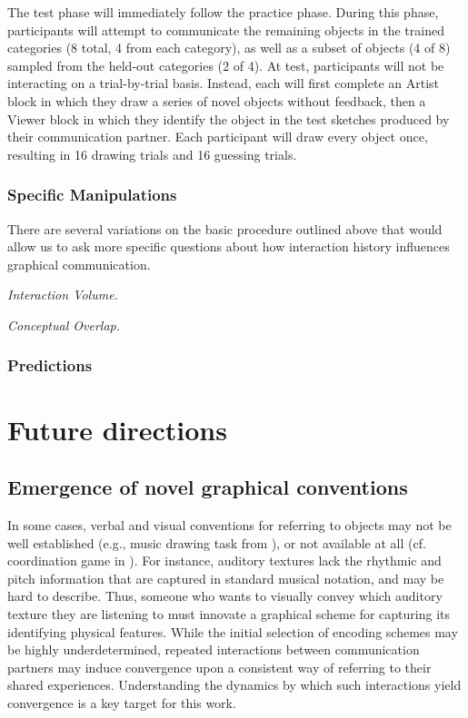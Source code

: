 \documentclass[12pt]{article}
\begin{document}
The test phase will immediately follow the practice phase. During this phase, participants will attempt to communicate the remaining objects in the trained categories (8 total, 4 from each category), as well as a subset of objects (4 of 8) sampled from the held-out categories (2 of 4). At test, participants will not be interacting on a trial-by-trial basis. Instead, each will first complete an Artist block in which they draw a series of novel objects without feedback, then a Viewer block in which they identify the object in the test sketches produced by their communication partner. Each participant will draw every object once, resulting in 16 drawing trials and 16 guessing trials. 

\subsubsection{Specific Manipulations}

There are several variations on the basic procedure outlined above that would allow us to ask more specific questions about how interaction history influences graphical communication.

\textit{Interaction Volume.}



\textit{Conceptual Overlap.}



\subsubsection{Predictions}



\section{Future directions}

\subsection{Emergence of novel graphical conventions}


In some cases, verbal and visual conventions for referring to objects may not be well established (e.g., music drawing task from ), or not available at all (cf. coordination game in ). For instance, auditory textures \cite{McDermott:2013ky} lack the rhythmic and pitch information that are captured in standard musical notation, and may be hard to describe. Thus, someone who wants to visually convey which auditory texture they are listening to must innovate a graphical scheme for capturing its identifying physical features. While the initial selection of encoding schemes may be highly underdetermined, repeated interactions between communication partners may induce convergence upon a consistent way of referring to their shared experiences. Understanding the dynamics by which such interactions yield convergence is a key target for this work. 
\end{document}
